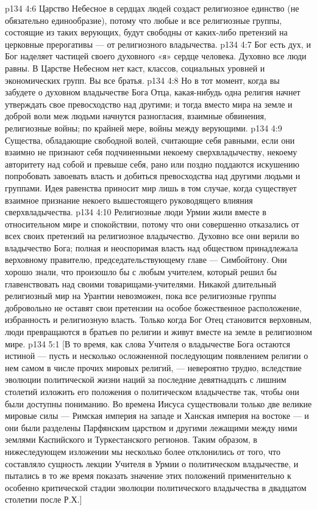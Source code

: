 \vs p134 4:6 Царство Небесное в сердцах людей создаст религиозное единство (не обязательно единообразие), потому что любые и все религиозные группы, состоящие из таких верующих, будут свободны от каких\hyp{}либо претензий на церковные прерогативы --- от религиозного владычества.
\vs p134 4:7 Бог есть дух, и Бог наделяет частицей своего духовного «я» сердце человека. Духовно все люди равны. В Царстве Небесном нет каст, классов, социальных уровней и экономических групп. Вы все братья.
\vs p134 4:8 Но в тот момент, когда вы забудете о духовном владычестве Бога Отца, какая\hyp{}нибудь одна религия начнет утверждать свое превосходство над другими; и тогда вместо мира на земле и доброй воли меж людьми начнутся разногласия, взаимные обвинения, религиозные войны; по крайней мере, войны между верующими.
\vs p134 4:9 Существа, обладающие свободной волей, считающие себя равными, если они взаимно не признают себя подчиненными некоему сверхвладычеству, некоему авторитету над собой и превыше себя, рано или поздно поддаются искушению попробовать завоевать власть и добиться превосходства над другими людьми и группами. Идея равенства приносит мир лишь в том случае, когда существует взаимное признание некоего вышестоящего руководящего влияния сверхвладычества.
\vs p134 4:10 Религиозные люди Урмии жили вместе в относительном мире и спокойствии, потому что они совершенно отказались от всех своих претензий на религиозное владычество. Духовно все они верили во владычество Бога; полная и неоспоримая власть над обществом принадлежала верховному правителю, председательствующему главе --- Симбойтону. Они хорошо знали, что произошло бы с любым учителем, который решил бы главенствовать над своими товарищами\hyp{}учителями. Никакой длительный религиозный мир на Урантии невозможен, пока все религиозные группы добровольно не оставят свои претензии на особое божественное расположение, избранность и религиозную власть. Только когда Бог Отец становится верховным, люди превращаются в братьев по религии и живут вместе на земле в религиозном мире.
\vs p134 5:1 [В то время, как слова Учителя о владычестве Бога остаются истиной --- пусть и несколько осложненной последующим появлением религии о нем самом в числе прочих мировых религий, --- невероятно трудно, вследствие эволюции политической жизни наций за последние девятнадцать с лишним столетий изложить его положения о политическом владычестве так, чтобы они были доступны пониманию. Во времена Иисуса существовали только две великие мировые силы --- Римская империя на западе и Ханская империя на востоке --- и они были разделены Парфянским царством и другими лежащими между ними землями Каспийского и Туркестанского регионов. Таким образом, в нижеследующем изложении мы несколько более отклонились от того, что составляло сущность лекции Учителя в Урмии о политическом владычестве, и пытались в то же время показать значение этих положений применительно к особенно критической стадии эволюции политического владычества в двадцатом столетии после Р.Х.]
